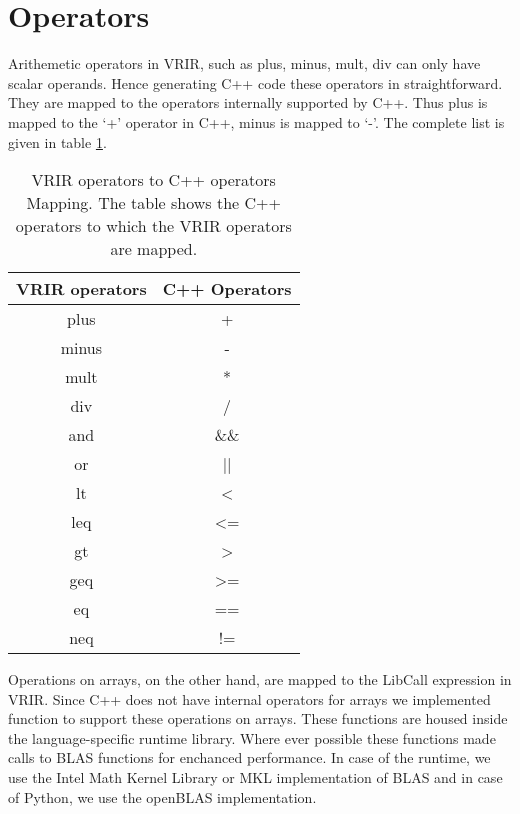 \section{Operators}
\label{sec:operators}
Arithemetic operators in VRIR, such as plus, minus, mult, div can only have scalar operands. Hence generating C++ code these operators in straightforward. They are mapped to the operators internally supported by C++. Thus plus is mapped to the `+' operator in C++, minus is mapped to `-'. The complete list is given in table \ref{tab:opMap}. \\
					\begin{table}[h]
					\centering
					\begin{tabular}{|c|c|}
					\hline
					VRIR operators & C++ Operators \\ \hline
					plus           & +             \\ \hline
					minus          & -             \\ \hline
					mult           & *             \\ \hline
					div            & /             \\ \hline
					and            & \&\&           \\ \hline
					or             & ||            \\ \hline
					lt             & \textless     \\ \hline
					leq            & \textless=    \\ \hline
					gt             & \textgreater  \\ \hline
					geq            & \textgreater= \\ \hline
					eq             & ==            \\ \hline
					neq            & !=            \\ \hline
					\end{tabular}
					\caption[opMap]{VRIR operators to C++ operators Mapping. The table shows the C++ operators to which the VRIR operators are mapped.}
					\label{tab:opMap}
					\end{table}
					Operations on arrays, on the other hand, are mapped to the LibCall expression in VRIR. Since C++ does not have internal operators for arrays we implemented function to support these operations on arrays. These functions are housed inside the language-specific runtime library. Where ever possible these functions made calls to BLAS functions for enchanced performance. In case of the \matlab\cite{matlab} runtime, we use the Intel Math Kernel Library\cite{mkl} or MKL implementation of BLAS and in case of Python\cite{python}, we use the openBLAS\cite{openblas} implementation.
